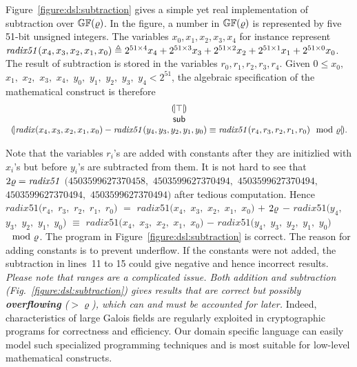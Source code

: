 Figure~\ref{figure:dsl:subtraction} gives a simple yet real
implementation of subtraction over $\mathbb{GF}(\varrho)$. 
In the figure, a number in $\mathbb{GF}(\varrho)$ 
is represented by five 51-bit unsigned integers. The variables
${x}_0, {x}_1, {x}_2, {x}_3, {x}_4$ for instance represent 
$\mathit{radix51}({x}_4, {x}_3, {x}_2, {x}_1, {x}_0) \triangleq
2^{51 \times 4} {x}_4 + 2^{51 \times 3} {x}_3 + 
2^{51 \times 2} {x}_2 + 2^{51 \times 1} {x}_1 + 
2^{51 \times 0} {x}_0$. The result of
subtraction is stored in the variables ${r}_0, {r}_1, {r}_2, {r}_3, {r}_4$. 
Given $0 \leq {x}_0,$ ${x}_1,$ ${x}_2,$ ${x}_3,$ ${x}_4,$ ${y}_0,$ 
${y}_1,$ ${y}_2,$ ${y}_3,$ ${y}_4 < 2^{51}$, 
the algebraic specification of the mathematical construct is therefore
\[
\begin{array}{c}
{(\!|}{\top}{|\!)}\\
\mbox{\textsf{sub}}\\
{(\!|}{\mathit{radix}({x}_4, {x}_3, {x}_2, {x}_1, {x}_0) -
\mathit{radix51}({y}_4, {y}_3, {y}_2, {y}_1, {y}_0)
\equiv
\mathit{radix51}({r}_4, {r}_3, {r}_2, {r}_1, {r}_0)
\mod {\varrho}
}{|\!)}.
\end{array}
\]

Note that the variables ${r}_i$'s are added with constants
after they are initizlied with ${x}_i$'s but before
${y}_i$'s are subtracted from them. It is not hard to see that
$2\varrho = \mathit{radix51}$ $(4503599627370458,$ $4503599627370494,$
$4503599627370494,$ $4503599627370494,$ $4503599627370494)$
after tedious computation. Hence $\mathit{radix51}({r}_4,$
${r}_3,$ ${r}_2,$ ${r}_1,$ ${r}_0)$ $=$
$\mathit{radix51}({x}_4,$ ${x}_3,$ ${x}_2,$ ${x}_1,$ ${x}_0)$ $+$ 
$2 \varrho $ $-$
$\mathit{radix51}({y}_4,$ ${y}_3,$ ${y}_2,$ ${y}_1,$ ${y}_0)$ 
$\equiv $
$\mathit{radix51}({x}_4,$ ${x}_3,$ ${x}_2,$ ${x}_1,$ ${x}_0)$ $-$
$\mathit{radix51}({y}_4,$ ${y}_3,$ ${y}_2,$ ${y}_1,$ ${y}_0)$ $\mod 
{\varrho} $. The program in
Figure~\ref{figure:dsl:subtraction} is correct. The reason for
adding constants is to prevent underflow. If the constants were not
added, the subtraction in lines~11 to 15 could give negative and hence
%
incorrect results. \emph{Please note that ranges are a complicated
  issue.  Both addition and subtraction (Fig.~\ref{figure:dsl:subtraction}) gives results that are correct
  but possibly \textbf{overflowing} ($>\varrho$), which can and must be
  accounted for later.} Indeed, characteristics of large Galois fields
are
%
regularly exploited in cryptographic programs for correctness and
efficiency. Our domain specific language can easily model such
specialized programming techniques and is most suitable for low-level
mathematical constructs.

